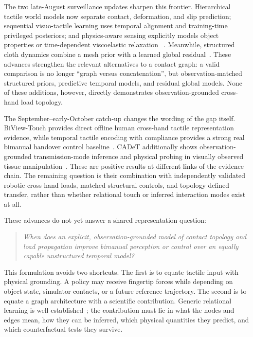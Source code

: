 The two late-August surveillance updates sharpen this frontier. Hierarchical
tactile world models now separate contact, deformation, and slip prediction;
sequential visuo-tactile learning uses temporal alignment and training-time
privileged posteriors; and physics-aware sensing explicitly models object
properties or time-dependent viscoelastic relaxation
~\cite{xue2026hitacwam,xu2026vtmuse,liu2026vitacphys,wang2026relaxation}.
Meanwhile, structured cloth dynamics combine a mesh prior with a learned global
residual~\cite{wang2026meshpriordit}. These advances strengthen the relevant
alternatives to a contact graph: a valid comparison is no longer ``graph versus
concatenation'', but observation-matched structured priors, predictive temporal
models, and residual global models. None of these additions, however, directly
demonstrates observation-grounded cross-hand load topology.

The September--early-October catch-up changes the wording of the gap itself.
BiView-Touch provides direct offline human cross-hand tactile representation
evidence, while temporal tactile encoding with compliance provides a strong real
bimanual handover control baseline~\cite{liang2026biviewtouch,marra2026temporaltactilehandover}.
CADeT additionally shows observation-grounded transmission-mode inference and
physical probing in visually observed tissue manipulation~\cite{hu2026cadet}.
These are positive results at different links of the evidence chain. The remaining
question is their combination with independently validated robotic cross-hand
loads, matched structural controls, and topology-defined transfer, rather than
whether relational touch or inferred interaction modes exist at all.

These advances do not yet answer a shared representation question:

\begin{quote}
\emph{When does an explicit, observation-grounded model of contact topology and
load propagation improve bimanual perception or control over an equally capable
unstructured temporal model?}
\end{quote}

This formulation avoids two shortcuts. The first is to equate tactile input with
physical grounding. A policy may receive fingertip forces while depending on
object state, simulator contacts, or a future reference trajectory. The second is
to equate a graph architecture with a scientific contribution. Generic relational
learning is well established~\cite{battaglia2016interaction,wang2018nervenet,ying2021graphormer};
the contribution must lie in what the nodes and edges mean, how they can be
inferred, which physical quantities they predict, and which counterfactual tests
they survive.

